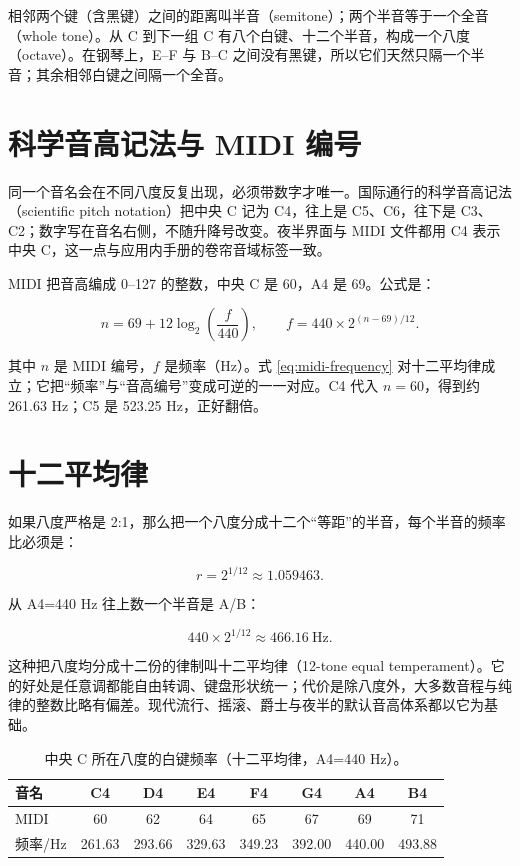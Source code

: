 相邻两个键（含黑键）之间的距离叫半音（semitone）；两个半音等于一个全音（whole tone）。从 C 到下一组 C 有八个白键、十二个半音，构成一个八度（octave）。在钢琴上，E–F 与 B–C 之间没有黑键，所以它们天然只隔一个半音；其余相邻白键之间隔一个全音。

\section{科学音高记法与 MIDI 编号}

同一个音名会在不同八度反复出现，必须带数字才唯一。国际通行的科学音高记法（scientific pitch notation）把中央 C 记为 C4，往上是 C5、C6，往下是 C3、C2；数字写在音名右侧，不随升降号改变。夜半界面与 MIDI 文件都用 C4 表示中央 C，这一点与应用内手册的卷帘音域标签一致。

MIDI 把音高编成 0–127 的整数，中央 C 是 60，A4 是 69。公式是：

\begin{equation}
  n = 69 + 12\log_2\!\left(\frac{f}{440}\right),
  \qquad
  f = 440 \times 2^{(n-69)/12}.
  \label{eq:midi-frequency}
\end{equation}

其中 \(n\) 是 MIDI 编号，\(f\) 是频率（Hz）。式 \eqref{eq:midi-frequency} 对十二平均律成立；它把“频率”与“音高编号”变成可逆的一一对应。C4 代入 \(n=60\)，得到约 261.63 Hz；C5 是 523.25 Hz，正好翻倍。

\section{十二平均律}

如果八度严格是 2:1，那么把一个八度分成十二个“等距”的半音，每个半音的频率比必须是：

\begin{equation}
  r = 2^{1/12} \approx 1.059463.
  \label{eq:semitone-ratio}
\end{equation}

从 A4=440 Hz 往上数一个半音是 A/B：

\[
  440 \times 2^{1/12} \approx 466.16\ \text{Hz}.
\]

这种把八度均分成十二份的律制叫十二平均律（12-tone equal temperament）。它的好处是任意调都能自由转调、键盘形状统一；代价是除八度外，大多数音程与纯律的整数比略有偏差。现代流行、摇滚、爵士与夜半的默认音高体系都以它为基础。

\begin{table}[htbp]
\centering
\small
\caption{中央 C 所在八度的白键频率（十二平均律，A4=440 Hz）。}
\begin{tabular}{lccccccc}
\toprule
音名 & C4 & D4 & E4 & F4 & G4 & A4 & B4 \\
\midrule
MIDI & 60 & 62 & 64 & 65 & 67 & 69 & 71 \\
频率/Hz & 261.63 & 293.66 & 329.63 & 349.23 & 392.00 & 440.00 & 493.88 \\
\bottomrule
\end{tabular}
\end{table}

